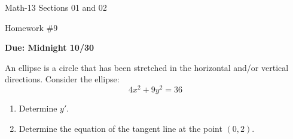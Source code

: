 \documentclass[letterpaper,12pt,fleqn]{article}
\begin{document}
\begin{center}
  \large
  Math-13 Sections 01 and 02

  \Large
  Homework \#9

  \large
  \textbf{Due: Midnight 10/30}
\end{center}

\vspace{0.5in}

An ellipse is a circle that has been stretched in the horizontal and/or vertical directions.  Consider the
ellipse:
\[4x^2+9y^2=36\]
\begin{enumerate}[left=0in]
\item Determine \(y'\).
\item Determine the equation of the tangent line at the point \((0,2)\).
\end{enumerate}
\end{document}
